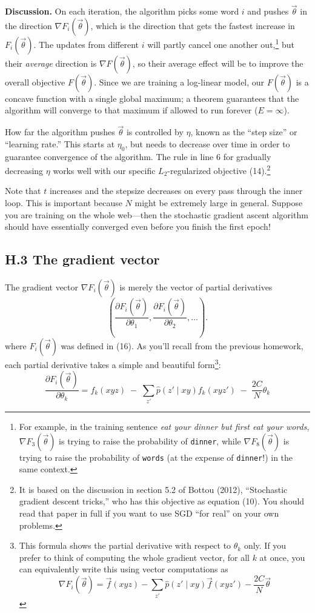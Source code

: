 \documentclass[12pt]{article}
\theoremstyle{plain}
\theoremstyle{definition}
\theoremstyle{remark}
\begin{document}
\noindent \textbf{Discussion.} On each iteration, the algorithm picks some word $i$ and pushes $\vec{\theta}$ in the direction $\nabla F_i(\vec{\theta})$, which is the direction that gets the fastest increase in $F_i(\vec{\theta})$. The updates from different $i$ will partly cancel one another out,\footnote{For example, in the training sentence \textit{eat your dinner but first eat your words}, $\nabla F_3(\vec{\theta})$ is trying to raise the probability of \texttt{dinner}, while $\nabla F_8(\vec{\theta})$ is trying to raise the probability of \texttt{words} (at the expense of \texttt{dinner}!) in the same context.} but their \emph{average} direction is $\nabla F(\vec{\theta})$, so their average effect will be to improve the overall objective $F(\vec{\theta})$. Since we are training a log-linear model, our $F(\vec{\theta})$ is a concave function with a single global maximum; a theorem guarantees that the algorithm will converge to that maximum if allowed to run forever ($E = \infty$).  

How far the algorithm pushes $\vec{\theta}$ is controlled by $\eta$, known as the “step size” or “learning rate.” This starts at $\eta_0$, but needs to decrease over time in order to guarantee convergence of the algorithm. The rule in line 6 for gradually decreasing $\eta$ works well with our specific $L_2$-regularized objective (14).\footnote{It is based on the discussion in section 5.2 of Bottou (2012), ``Stochastic gradient descent tricks,'' who has this objective as equation (10). You should read that paper in full if you want to use SGD ``for real'' on your own problems.}

Note that $t$ increases and the stepsize decreases on every pass through the inner loop. This is important because $N$ might be extremely large in general. Suppose you are training on the whole web—then the stochastic gradient ascent algorithm should have essentially converged even before you finish the first epoch!  

\subsection*{H.3 The gradient vector}

The gradient vector $\nabla F_i(\vec{\theta})$ is merely the vector of partial derivatives 
\[
\left( \frac{\partial F_i(\vec{\theta})}{\partial \theta_1}, \frac{\partial F_i(\vec{\theta})}{\partial \theta_2}, \ldots \right).
\]
where $F_i(\vec{\theta})$ was defined in (16). As you’ll recall from the previous homework, each partial derivative takes a simple and beautiful form\footnote{This formula shows the partial derivative with respect to $\theta_k$ only. If you prefer to think of computing the whole gradient vector, for all $k$ at once, you can equivalently write this using vector computations as 
\[
\nabla F_i(\vec{\theta}) = \vec{f}(xyz) - \sum_{z'} \hat{p}(z' \mid xy)\vec{f}(xyz') - \frac{2C}{N}\vec{\theta}
\]}:
\begin{equation}
\frac{\partial F_i(\vec{\theta})}{\partial \theta_k} = f_k(xyz) \;-\; \sum_{z'} \hat{p}(z' \mid xy) f_k(xyz') \;-\; \frac{2C}{N}\theta_k
\end{equation}
\end{document}
